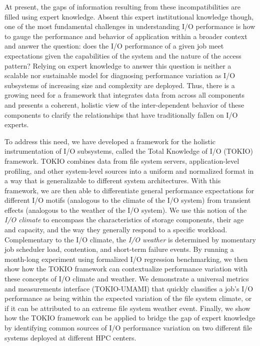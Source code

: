 At present, the gaps of information resulting from these incompatibilities are filled using expert knowledge.
Absent this expert institutional knowledge though, one of the most fundamental challenges in understanding I/O performance is how to gauge the performance and behavior of application within a broader context and answer the question: 
does the I/O performance of a given job meet expectations given the capabilities of the system and the nature of the access pattern?
Relying on expert knowledge to answer this question is neither a scalable nor sustainable model for diagnosing performance variation as I/O subsystems of increasing size and complexity are deployed.
Thus, there is a growing need for a framework that integrates data from across all components and presents a coherent, holistic view of the inter-dependent behavior of these components to clarify the relationships that have traditionally fallen on I/O experts.

To address this need, we have developed a framework for the holistic instrumentation of I/O subsystems, called the Total Knowledge of I/O (TOKIO) framework.
TOKIO combines data from file system servers, application-level profiling, and other system-level sources into a uniform and normalized format in a way that is generalizable to different system architectures.
With this framework, we are then able to differentiate general performance expectations for different I/O motifs (analogous to the climate of the I/O system) from transient effects (analogous to the weather of the I/O system).
We use this notion of the \emph{I/O climate} to encompass the characteristics of storage components, their age and capacity, and the way they generally respond to a specific workload.
Complementary to the I/O climate, the \emph{I/O weather} is determined by momentary job scheduler load, contention, and short-term failure events.
By running a month-long experiment using formalized I/O regression benchmarking, we then show how the TOKIO framework can contextualize performance variation with these concepts of I/O climate and weather.
We demonstrate a universal metrics and measurements interface (TOKIO-UMAMI) that quickly classifies a job's I/O performance as being within the expected variation of the file system climate, or if it can be attributed to an extreme file system weather event. 
Finally, we show how the TOKIO framework can be applied to bridge the gap of expert knowledge by identifying common sources of I/O performance variation on two different file systems deployed at different HPC centers.

